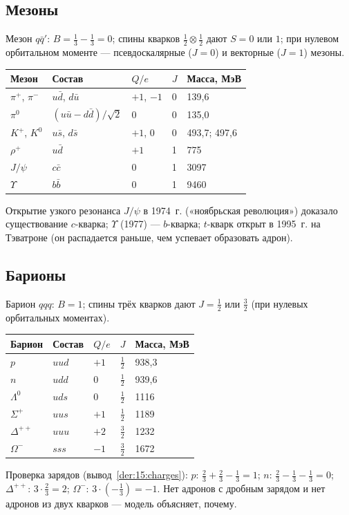 \subsection{Мезоны}

Мезон $q\bar q'$: $B=\frac13-\frac13=0$; спины кварков $\frac12\otimes\frac12$ дают $S=0$ или $1$; при нулевом
орбитальном моменте — псевдоскалярные ($J=0$) и векторные ($J=1$) мезоны.
\begin{center}
\small
\begin{tabular}{@{}lllll@{}}
\toprule
Мезон & Состав & $Q/e$ & $J$ & Масса, МэВ \\
\midrule
$\pi^+$, $\pi^-$ & $u\bar d$, $d\bar u$ & $+1$, $-1$ & 0 & 139,6 \\
$\pi^0$ & $(u\bar u-d\bar d)/\sqrt2$ & 0 & 0 & 135,0 \\
$K^+$, $K^0$ & $u\bar s$, $d\bar s$ & $+1$, 0 & 0 & 493,7; 497,6 \\
$\rho^+$ & $u\bar d$ & $+1$ & 1 & 775 \\
$J/\psi$ & $c\bar c$ & 0 & 1 & 3097 \\
$\Upsilon$ & $b\bar b$ & 0 & 1 & 9460 \\
\bottomrule
\end{tabular}
\end{center}
Открытие узкого резонанса $J/\psi$ в 1974~г. («ноябрьская революция») доказало существование $c$-кварка;
$\Upsilon$ (1977) — $b$-кварка; $t$-кварк открыт в 1995~г. на Тэватроне (он распадается раньше, чем успевает
образовать адрон).

\subsection{Барионы}

Барион $qqq$: $B=1$; спины трёх кварков дают $J=\frac12$ или $\frac32$ (при нулевых орбитальных моментах).
\begin{center}
\small
\begin{tabular}{@{}lllll@{}}
\toprule
Барион & Состав & $Q/e$ & $J$ & Масса, МэВ \\
\midrule
$p$ & $uud$ & $+1$ & $\frac12$ & 938,3 \\
$n$ & $udd$ & 0 & $\frac12$ & 939,6 \\
$\Lambda^0$ & $uds$ & 0 & $\frac12$ & 1116 \\
$\Sigma^+$ & $uus$ & $+1$ & $\frac12$ & 1189 \\
$\Delta^{++}$ & $uuu$ & $+2$ & $\frac32$ & 1232 \\
$\Omega^-$ & $sss$ & $-1$ & $\frac32$ & 1672 \\
\bottomrule
\end{tabular}
\end{center}
Проверка зарядов (вывод~\ref{der:15:charges}): $p$: $\frac23+\frac23-\frac13=1$; $n$: $\frac23-\frac13-\frac13=0$;
$\Delta^{++}$: $3\cdot\frac23=2$; $\Omega^-$: $3\cdot(-\frac13)=-1$. Нет адронов с дробным зарядом и нет
адронов из двух кварков — модель объясняет, почему.

